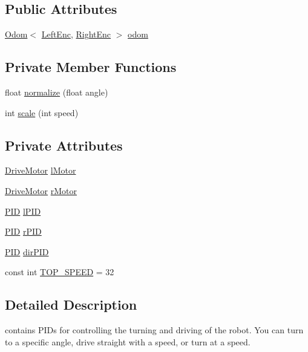 \subsection*{Public Attributes}
\begin{DoxyCompactItemize}
\item 
\hyperlink{classOdom}{Odom}$<$ \hyperlink{classPIDBase_a7f9720adebb7763418d066d4fc4f8e25}{Left\-Enc}, \hyperlink{classPIDBase_ac5805fb7b51c9e4fedaab034d268464a}{Right\-Enc} $>$ \hyperlink{classPIDBase_a3adee9b84ba975616f672a7620ac16b8}{odom}
\end{DoxyCompactItemize}
\subsection*{Private Member Functions}
\begin{DoxyCompactItemize}
\item 
float \hyperlink{classPIDBase_a57c25abb7d7981fc0498fee62312d50e}{normalize} (float angle)
\item 
int \hyperlink{classPIDBase_acf14092bf5bcbc54e8bb717b37524534}{scale} (int speed)
\end{DoxyCompactItemize}
\subsection*{Private Attributes}
\begin{DoxyCompactItemize}
\item 
\hyperlink{classDriveMotor}{Drive\-Motor} \hyperlink{classPIDBase_a344ca2736e618d42445d568d038be7d9}{l\-Motor}
\item 
\hyperlink{classDriveMotor}{Drive\-Motor} \hyperlink{classPIDBase_ae52cf8a147c90af4334e1ad14f48aa4a}{r\-Motor}
\item 
\hyperlink{classPID}{P\-I\-D} \hyperlink{classPIDBase_a7e39df880dd6279479e77febe800a6ba}{l\-P\-I\-D}
\item 
\hyperlink{classPID}{P\-I\-D} \hyperlink{classPIDBase_a940d3dae6038a472ea613c03c5be3846}{r\-P\-I\-D}
\item 
\hyperlink{classPID}{P\-I\-D} \hyperlink{classPIDBase_a00db94bebcd5b966d8ee1020f8c33951}{dir\-P\-I\-D}
\item 
const int \hyperlink{classPIDBase_a42e66aae0ea7d5a54bffc062cc3ebf2b}{T\-O\-P\-\_\-\-S\-P\-E\-E\-D} = 32
\end{DoxyCompactItemize}


\subsection{Detailed Description}
contains P\-I\-Ds for controlling the turning and driving of the robot. You can turn to a specific angle, drive straight with a speed, or turn at a speed. 

